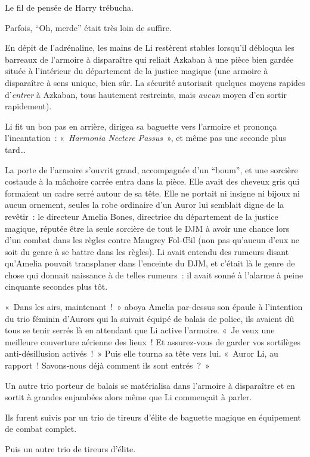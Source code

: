 Le fil de pensée de Harry trébucha.

Parfois, “Oh, merde” était très loin de suffire.

\later

En dépit de l'adrénaline, les mains de Li restèrent stables lorsqu'il débloqua les barreaux de l'armoire à disparaître qui reliait Azkaban à une pièce bien gardée située à l'intérieur du département de la justice magique (une armoire à disparaître à sens unique, bien sûr. La sécurité autorisait quelques moyens rapides d'\emph{entrer} à Azkaban, tous hautement restreints, mais \emph{aucun} moyen d'en sortir rapidement).

Li fit un bon pas en arrière, dirigea sa baguette vers l'armoire et prononça l'incantation~: «~\emph{Harmonia Nectere Passus}~», et même pas une seconde plus tard…

La porte de l'armoire s'ouvrit grand, accompagnée d'un “boum”, et une sorcière costaude à la mâchoire carrée entra dans la pièce. Elle avait des cheveux gris qui formaient un cadre serré autour de sa tête. Elle ne portait ni insigne ni bijoux ni aucun ornement, seules la robe ordinaire d'un Auror lui semblait digne de la revêtir~: le directeur Amelia Bones, directrice du département de la justice magique, réputée être la seule sorcière de tout le DJM à avoir une chance lors d'un combat dans les règles contre Maugrey Fol-Œil (non pas qu'aucun d'eux ne soit du genre à se battre dans les règles). Li avait entendu des rumeurs disant qu'Amelia pouvait transplaner dans l'enceinte du DJM, et c'était là le genre de chose qui donnait naissance à de telles rumeurs~: il avait sonné à l'alarme à peine cinquante secondes plus tôt.

«~Dans les airs, maintenant~!~» aboya Amelia par-dessus son épaule à l'intention du trio féminin d'Aurors qui la suivait équipé de balais de police, ils avaient dû tous se tenir serrés là en attendant que Li active l'armoire. «~Je veux une meilleure couverture aérienne des lieux~! Et assurez-vous de garder vos sortilèges anti-désillusion activés~!~» Puis elle tourna sa tête vers lui. «~Auror Li, au rapport~! Savons-nous déjà comment ils sont entrés~?~»

Un autre trio porteur de balais se matérialisa dans l'armoire à disparaître et en sortit à grandes enjambées alors même que Li commençait à parler.

Ils furent suivis par un trio de tireurs d'élite de baguette magique en équipement de combat complet.

Puis un autre trio de tireurs d'élite.

